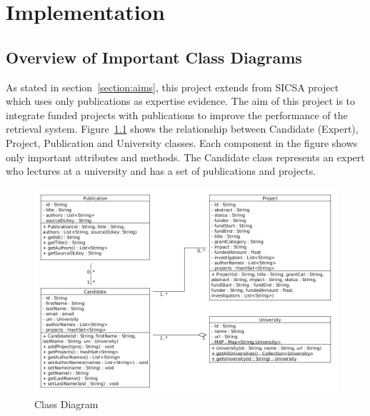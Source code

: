 
\chapter{Implementation}\label{section:implementation}

\section{Overview of Important Class Diagrams}

As stated in section~\ref{section:aims}, this project extends from SICSA project which uses only publications as expertise evidence.
The aim of this project is to integrate funded projects with publications to improve the performance of the retrieval system.
Figure~\ref{fig:classDiagram1} shows the relationship between Candidate (Expert), Project, Publication and University classes. Each component in the figure
shows only important attributes and methods. The Candidate class represents an expert who lectures at a university and has a set of publications and projects.
\begin{figure}
\centering
\includegraphics[scale=0.4]{./figures/classDiagram1.png}
\caption{Class Diagram} \label{fig:classDiagram1} 
\end{figure}

